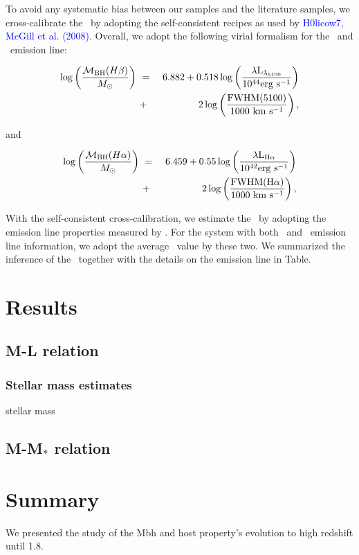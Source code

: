 \documentclass[apj]{emulateapj}
\begin{document}
To avoid any systematic bias between our samples and the literature samples, we cross-calibrate the \mbh\ by adopting the self-consistent recipes as used by \textcolor{blue}{H0licow7, McGill et al. (2008)}. Overall, we adopt the following virial formalism for the \halpha\ and \hbeta\ emission line:

\begin{eqnarray}
\label{eq:Hb}
\log \left(\frac{\mathcal M_{\rm BH}(H\beta) }{M_{\odot}}\right)&~=~& 6.882+0.518\log \left(\frac{ \lambda \rm L _{\lambda_{5100}}}{10^{44}{\rm erg~s^{-1}}}\right) \nonumber\\
&~+~& 2 \log \left(\frac{\rm FWHM(5100)}{1000 ~{\rm km~s^{-1}}}\right) , 
\end {eqnarray}

and

\begin{eqnarray}
\label{eq:Ha}
\log \left(\frac{\mathcal M_{\rm BH} (H\alpha)}{M_{\odot}}\right)&~=~& 6.459+0.55 \log \left(\frac{ \lambda \rm L _{H\alpha}}{10^{42}{\rm erg~s^{-1}}}\right) \nonumber\\
&~+~& 2 \log \left(\frac{\rm FWHM(H\alpha)}{1000 ~{\rm km~s^{-1}}}\right) , 
\end {eqnarray}

With the self-consistent cross-calibration, we estimate the \mbh\ by adopting the emission line properties measured by \citet{Schulze2018}. For the system with both \halpha\ and \hbeta\ emission line information, we adopt the average \mbh\ value by these two. We summarized the inference of the \mbh\ together with the details on the emission line in Table.


\section{Results}
\label{sec:result}
\subsection{M-L relation}
\subsubsection{Stellar mass estimates}
stellar mass \\
\subsection{M-M$_*$ relation}

\section{Summary}
\label{sec:sum}
We presented the study of the Mbh and host property's evolution to high redshift until 1.8.
\end{document}
